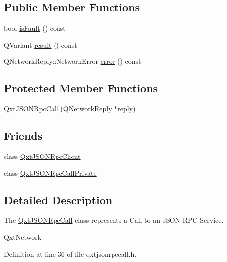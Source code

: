 \subsection*{Public Member Functions}
\begin{DoxyCompactItemize}
\item 
bool \hyperlink{class_qxt_j_s_o_n_rpc_call_ac5a63a0d001419ac7c52f6741afc052f}{is\-Fault} () const 
\item 
Q\-Variant \hyperlink{class_qxt_j_s_o_n_rpc_call_a7dd22096222ab7b6d857a7aceea97363}{result} () const 
\item 
Q\-Network\-Reply\-::\-Network\-Error \hyperlink{class_qxt_j_s_o_n_rpc_call_a23e415fb2883fb72700134169c03aa85}{error} () const 
\end{DoxyCompactItemize}
\subsection*{Protected Member Functions}
\begin{DoxyCompactItemize}
\item 
\hyperlink{class_qxt_j_s_o_n_rpc_call_a4114d524abe8bdecee5ea12ee3c56515}{Qxt\-J\-S\-O\-N\-Rpc\-Call} (Q\-Network\-Reply $\ast$reply)
\end{DoxyCompactItemize}
\subsection*{Friends}
\begin{DoxyCompactItemize}
\item 
class \hyperlink{class_qxt_j_s_o_n_rpc_call_a728f2d6e1664e8cbe2c0838171b6e520}{Qxt\-J\-S\-O\-N\-Rpc\-Client}
\item 
class \hyperlink{class_qxt_j_s_o_n_rpc_call_a5d6a80473fb1d21c3aca6e0a8e7696ce}{Qxt\-J\-S\-O\-N\-Rpc\-Call\-Private}
\end{DoxyCompactItemize}


\subsection{Detailed Description}
The \hyperlink{class_qxt_j_s_o_n_rpc_call}{Qxt\-J\-S\-O\-N\-Rpc\-Call} class represents a Call to an J\-S\-O\-N-\/\-R\-P\-C Service. 

Qxt\-Network 

Definition at line 36 of file qxtjsonrpccall.\-h.



